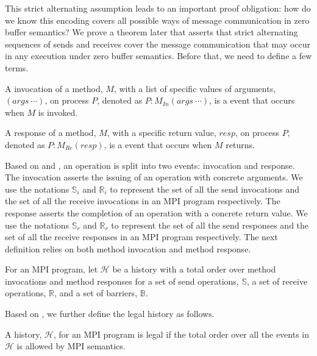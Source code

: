This strict alternating assumption leads to an important proof obligation: how do we know this encoding covers all possible ways of message communication in zero buffer semantics? We prove a theorem later that asserts that strict alternating sequences of sends and receives cover the message communication that may occur in any execution under zero buffer semantics. Before that, we need to define a few terms.

\begin{definition}\label{def:invocation}
A invocation of a method, $M$, with a list of specific values of arguments, $(args\ \cdots)$, on process $P$, denoted as $P:M_\mathit{In}(args\ \cdots)$, is a event that occurs when $M$ is invoked.
\end{definition}

\begin{definition}\label{def:response}
A response of a method, $M$, with a specific return value, $resp$, on process $P$, denoted as $P:M_\mathit{Re}(resp)$, is a event that occurs when $M$ returns.
\end{definition}

Based on  and , an operation is split into two events: invocation and response. The invocation asserts the issuing of an operation with concrete arguments. We use the notations $\mathbb{S}_i$ and $\mathbb{R}_i$ to represent the set of all the send invocations and the set of all the receive invocations in an MPI program respectively. The response asserts the completion of an operation with a concrete return value. We use the notations $\mathbb{S}_r$ and $\mathbb{R}_r$ to represent the set of all the send responses and the set of all the receive responses in an MPI program respectively. The next definition relies on both method invocation and method response. 

\begin{definition}[History]\label{def:history}
For an MPI program, let $\mathcal{H}$ be a history with a total order over method invocations and method responses for a set of send operations, $\mathbb{S}$, a set of receive operations, $\mathbb{R}$, and a set of barriers, $\mathbb{B}$.
\end{definition}

Based on , we further define the legal history as follows.

\begin{definition}\label{def:legal}
A history, $\mathcal{H}$, for an MPI program is legal if the total order over all the events in $\mathcal{H}$ is allowed by MPI semantics.
\end{definition}

